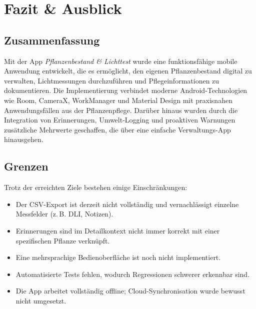 \documentclass[14pt,a4paper]{report}
\begin{document}
\chapter{Fazit \& Ausblick}

\section{Zusammenfassung}
Mit der App \textit{Pflanzenbestand \& Lichttest} wurde eine funktionsfähige mobile Anwendung entwickelt, die es ermöglicht,
den eigenen Pflanzenbestand digital zu verwalten, Lichtmessungen durchzuführen und Pflegeinformationen zu dokumentieren. 
Die Implementierung verbindet moderne Android-Technologien wie Room, CameraX, WorkManager und Material Design 
mit praxisnahen Anwendungsfällen aus der Pflanzenpflege.  
Darüber hinaus wurden durch die Integration von Erinnerungen, Umwelt-Logging und proaktiven Warnungen zusätzliche Mehrwerte geschaffen,
die über eine einfache Verwaltungs-App hinausgehen.

\section{Grenzen}
Trotz der erreichten Ziele bestehen einige Einschränkungen:
\begin{itemize}
    \item Der CSV-Export ist derzeit nicht vollständig und vernachlässigt einzelne Messfelder (z.\,B. DLI, Notizen).
    \item Erinnerungen sind im Detailkontext nicht immer korrekt mit einer spezifischen Pflanze verknüpft.
    \item Eine mehrsprachige Bedienoberfläche ist noch nicht implementiert.
    \item Automatisierte Tests fehlen, wodurch Regressionen schwerer erkennbar sind.
    \item Die App arbeitet vollständig offline; Cloud-Synchronisation wurde bewusst nicht umgesetzt.
\end{itemize}
\end{document}
